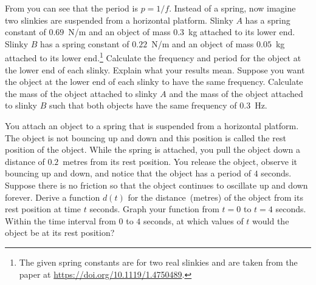 \documentclass[a4paper,oneside,12pt]{article}
\begin{document}
\begin{problem}
\begin{packedenum}
  \item\label{subprob:trigonometric:spring_slinky}
    From  you can see
    that the period is $p = 1 / f$.  Instead of a spring, now imagine
    two slinkies are suspended from a horizontal platform.  Slinky $A$
    has a spring constant of $0.69$~N/m and an object of mass $0.3$~kg
    attached to its lower end.  Slinky $B$ has a spring constant of
    $0.22$~N/m and an object of mass $0.05$~kg attached to its lower
    end.\footnote{
      The given spring constants are for two real slinkies and are
      taken from the paper at
      \url{https://doi.org/10.1119/1.4750489}.
    }
    Calculate the frequency and period for the object at the lower end
    of each slinky.  Explain what your results mean.  Suppose you want
    the object at the lower end of each slinky to have the same
    frequency.  Calculate the mass of the object attached to slinky
    $A$ and the mass of the object attached to slinky $B$ such that
    both objects have the same frequency of $0.3$~Hz.

  \item\label{subprob:trigonometric:spring_displacement}
    You attach an object to a spring that is suspended from a
    horizontal platform.  The object is not bouncing up and down and
    this position is called the rest position of the object.  While
    the spring is attached, you pull the object down a distance of
    $0.2$~metres from its rest position.  You release the object,
    observe it bouncing up and down, and notice that the object has a
    period of $4$ seconds.  Suppose there is no friction so that the
    object continues to oscillate up and down forever.  Derive a
    function $d(t)$ for the distance~(metres) of the object from its
    rest position at time $t$ seconds.  Graph your function from
    $t = 0$ to $t = 4$ seconds.  Within the time interval from $0$ to
    $4$ seconds, at which values of $t$ would the object be at its
    rest position?


\end{packedenum}
\end{problem}
\end{document}
